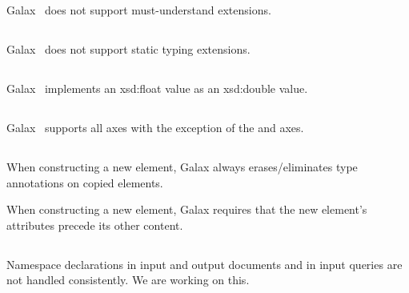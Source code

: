    Galax \version\ does not support must-understand extensions.

\subsection*{}

   Galax \version\ does not support static typing extensions.

\subsection*{}

   Galax \version\ implements an xsd:float value as an xsd:double value.

\subsection*{}

   Galax \version\ supports all axes with the exception of the
    and  axes.

\subsection*{}

When constructing a new element, Galax \version always
erases/eliminates type annotations on copied elements. 

When constructing a new element, Galax \version requires that 
the new element's attributes precede its other content. 

\subsection*{}

Namespace declarations in input and output documents and in input
queries are not handled consistently. 
We are working on
this.

\subsection*{}

